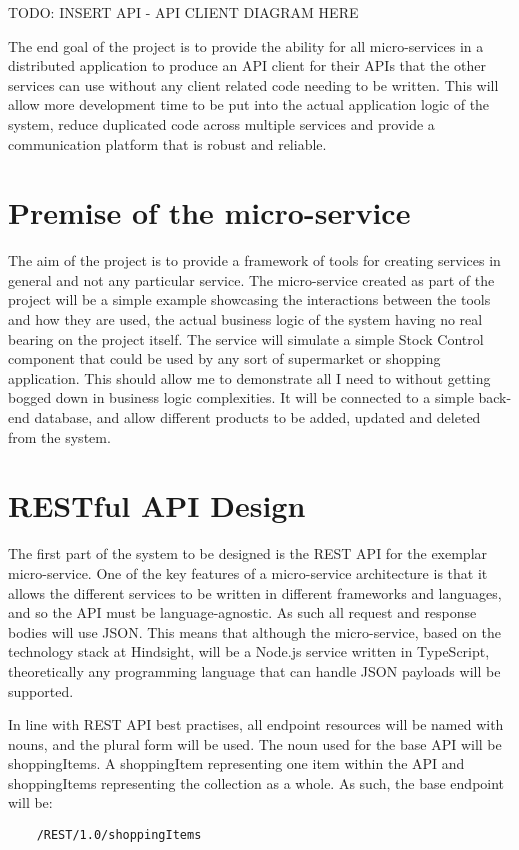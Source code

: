 TODO: INSERT API - API CLIENT DIAGRAM HERE

The end goal of the project is to provide the ability for all micro-services in a distributed application to produce an API client for their APIs that the other services can use without any client related code needing to be written. This will allow more development time to be put into the actual application logic of the system, reduce duplicated code across multiple services and provide a communication platform that is robust and reliable. 

\section{Premise of the micro-service}
The aim of the project is to provide a framework of tools for creating services in general and not any particular service. The micro-service created as part of the project will be a simple example showcasing the interactions between the tools and how they are used, the actual business logic of the system having no real bearing on the project itself. The service will simulate a simple Stock Control component that could be used by any sort of supermarket or shopping application. This should allow me to demonstrate all I need to without getting bogged down in business logic complexities. It will be connected to a simple back-end database, and allow different products to be added, updated and deleted from the system. 

\section{RESTful API Design}
The first part of the system to be designed is the REST API for the exemplar micro-service. One of the key features of a micro-service architecture is that it allows the different services to be written in different frameworks and languages, and so the API must be language-agnostic. As such all request and response bodies will use JSON. This means that although the micro-service, based on the technology stack at Hindsight, will be a Node.js service written in TypeScript, theoretically any programming language that can handle JSON payloads will be supported.

In line with REST API best practises, all endpoint resources will be named with nouns, and the plural form will be used. The noun used for the base API will be shoppingItems. A shoppingItem representing one item within the API and shoppingItems representing the collection as a whole. 
As such, the base endpoint will be:
\begin{verbatim}
    /REST/1.0/shoppingItems
\end{verbatim}

